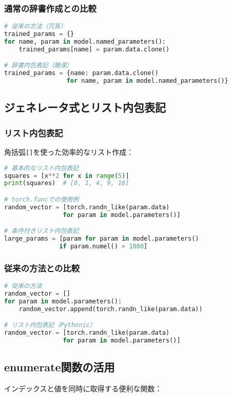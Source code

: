 \documentclass{ltjsarticle}      %
\begin{document}
\subsubsection{通常の辞書作成との比較}
\begin{lstlisting}[language=Python]
# 従来の方法（冗長）
trained_params = {}
for name, param in model.named_parameters():
    trained_params[name] = param.data.clone()

# 辞書内包表記（簡潔）
trained_params = {name: param.data.clone() 
                 for name, param in model.named_parameters()}
\end{lstlisting}

\subsection{ジェネレータ式とリスト内包表記}

\subsubsection{リスト内包表記}
角括弧\texttt{[]}を使った効率的なリスト作成：

\begin{lstlisting}[language=Python]
# 基本的なリスト内包表記
squares = [x**2 for x in range(5)]
print(squares)  # [0, 1, 4, 9, 16]

# torch.funcでの使用例
random_vector = [torch.randn_like(param.data) 
                for param in model.parameters()]

# 条件付きリスト内包表記
large_params = [param for param in model.parameters() 
               if param.numel() > 1000]
\end{lstlisting}

\subsubsection{従来の方法との比較}
\begin{lstlisting}[language=Python]
# 従来の方法
random_vector = []
for param in model.parameters():
    random_vector.append(torch.randn_like(param.data))

# リスト内包表記（Pythonic）
random_vector = [torch.randn_like(param.data) 
                for param in model.parameters()]
\end{lstlisting}

\subsection{enumerate関数の活用}
インデックスと値を同時に取得する便利な関数：
\end{document}
